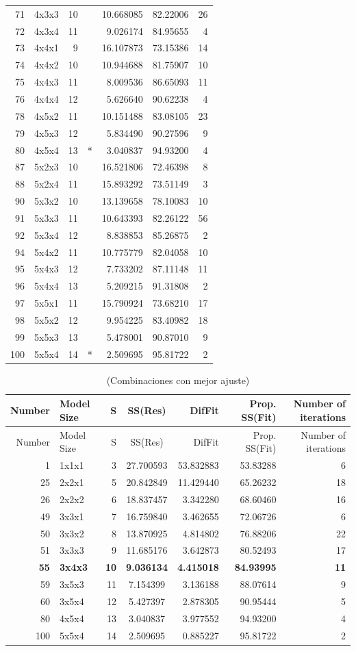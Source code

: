 \documentclass[
  spanish,
]{article}
\begin{document}
\begin{longtable}[]{@{}rlrlrrr@{}}
71 & 4x3x3 & 10 & & 10.668085 & 82.22006 & 26\tabularnewline
72 & 4x3x4 & 11 & & 9.026174 & 84.95655 & 4\tabularnewline
73 & 4x4x1 & 9 & & 16.107873 & 73.15386 & 14\tabularnewline
74 & 4x4x2 & 10 & & 10.944688 & 81.75907 & 10\tabularnewline
75 & 4x4x3 & 11 & & 8.009536 & 86.65093 & 11\tabularnewline
76 & 4x4x4 & 12 & & 5.626640 & 90.62238 & 4\tabularnewline
78 & 4x5x2 & 11 & & 10.151488 & 83.08105 & 23\tabularnewline
79 & 4x5x3 & 12 & & 5.834490 & 90.27596 & 9\tabularnewline
80 & 4x5x4 & 13 & * & 3.040837 & 94.93200 & 4\tabularnewline
87 & 5x2x3 & 10 & & 16.521806 & 72.46398 & 8\tabularnewline
88 & 5x2x4 & 11 & & 15.893292 & 73.51149 & 3\tabularnewline
90 & 5x3x2 & 10 & & 13.139658 & 78.10083 & 10\tabularnewline
91 & 5x3x3 & 11 & & 10.643393 & 82.26122 & 56\tabularnewline
92 & 5x3x4 & 12 & & 8.838853 & 85.26875 & 2\tabularnewline
94 & 5x4x2 & 11 & & 10.775779 & 82.04058 & 10\tabularnewline
95 & 5x4x3 & 12 & & 7.733202 & 87.11148 & 11\tabularnewline
96 & 5x4x4 & 13 & & 5.209215 & 91.31808 & 2\tabularnewline
97 & 5x5x1 & 11 & & 15.790924 & 73.68210 & 17\tabularnewline
98 & 5x5x2 & 12 & & 9.954225 & 83.40982 & 18\tabularnewline
99 & 5x5x3 & 13 & & 5.478001 & 90.87010 & 9\tabularnewline
100 & 5x5x4 & 14 & * & 2.509695 & 95.81722 & 2\tabularnewline
\bottomrule
\end{longtable}

\begin{longtable}[]{@{}rlrcrrr@{}}
\caption{(Combinaciones con mejor ajuste) \label{mej-ajuste}}\tabularnewline
\toprule
Number & Model Size & S & SS(Res) & DifFit & Prop. SS(Fit) & Number of iterations\tabularnewline
\midrule
\endfirsthead
\toprule
Number & Model Size & S & SS(Res) & DifFit & Prop. SS(Fit) & Number of iterations\tabularnewline
\midrule
\endhead
1 & 1x1x1 & 3 & 27.700593 & 53.832883 & 53.83288 & 6\tabularnewline
25 & 2x2x1 & 5 & 20.842849 & 11.429440 & 65.26232 & 18\tabularnewline
26 & 2x2x2 & 6 & 18.837457 & 3.342280 & 68.60460 & 16\tabularnewline
49 & 3x3x1 & 7 & 16.759840 & 3.462655 & 72.06726 & 6\tabularnewline
50 & 3x3x2 & 8 & 13.870925 & 4.814802 & 76.88206 & 22\tabularnewline
51 & 3x3x3 & 9 & 11.685176 & 3.642873 & 80.52493 & 17\tabularnewline
\textbf{55} & \textbf{3x4x3} & \textbf{10} & \textbf{9.036134} & \textbf{4.415018} & \textbf{84.93995} & \textbf{11}\tabularnewline
59 & 3x5x3 & 11 & 7.154399 & 3.136188 & 88.07614 & 9\tabularnewline
60 & 3x5x4 & 12 & 5.427397 & 2.878305 & 90.95444 & 5\tabularnewline
80 & 4x5x4 & 13 & 3.040837 & 3.977552 & 94.93200 & 4\tabularnewline
100 & 5x5x4 & 14 & 2.509695 & 0.885227 & 95.81722 & 2\tabularnewline
\bottomrule
\end{longtable}
\end{document}
